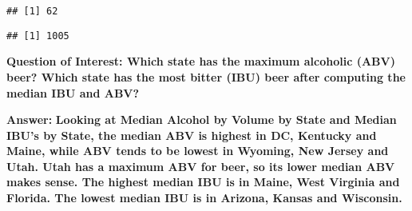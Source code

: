 \documentclass[
]{article}
\newenvironment{Shaded}{\begin{snugshade}}{\end{snugshade}}
\newcommand{\DataTypeTok}[1]{\textcolor[rgb]{0.13,0.29,0.53}{#1}}
\newcommand{\DecValTok}[1]{\textcolor[rgb]{0.00,0.00,0.81}{#1}}
\newcommand{\FloatTok}[1]{\textcolor[rgb]{0.00,0.00,0.81}{#1}}
\newcommand{\KeywordTok}[1]{\textcolor[rgb]{0.13,0.29,0.53}{\textbf{#1}}}
\newcommand{\NormalTok}[1]{#1}
\newcommand{\OperatorTok}[1]{\textcolor[rgb]{0.81,0.36,0.00}{\textbf{#1}}}
\newcommand{\StringTok}[1]{\textcolor[rgb]{0.31,0.60,0.02}{#1}}
\begin{document}
\begin{Shaded}
\end{Shaded}

\begin{verbatim}
## [1] 62
\end{verbatim}

\begin{Shaded}
\end{Shaded}

\begin{verbatim}
## [1] 1005
\end{verbatim}

\textbf{Question of Interest: Which state has the maximum alcoholic
(ABV) beer? Which state has the most bitter (IBU) beer after computing
the median IBU and ABV?}

\textbf{Answer:} \textbf{Looking at Median Alcohol by Volume by State
and Median IBU's by State, the median ABV is highest in DC, Kentucky and
Maine, while ABV tends to be lowest in Wyoming, New Jersey and Utah.
Utah has a maximum ABV for beer, so its lower median ABV makes sense.
The highest median IBU is in Maine, West Virginia and Florida. The
lowest median IBU is in Arizona, Kansas and Wisconsin.}

\begin{Shaded}
\end{Shaded}
\end{document}
